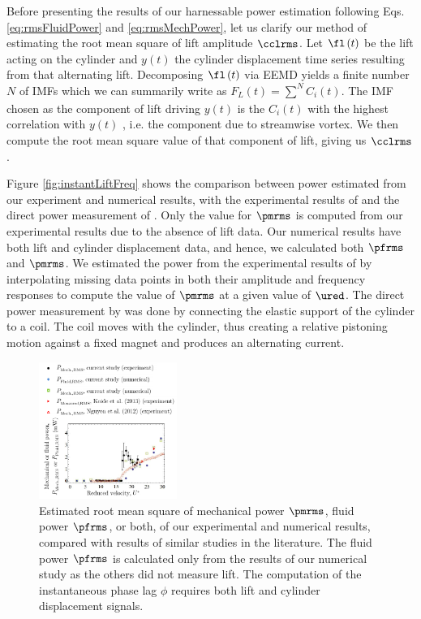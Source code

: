 \documentclass[a4paper,fleqn]{cas-sc}
\begin{document}
Before presenting the results of our harnessable power estimation following Eqs. \ref{eq:rmsFluidPower} and \ref{eq:rmsMechPower}, let us clarify our method of estimating the root mean square of lift amplitude $\cclrms$. Let $\fl\left( t \right)$ be the lift acting on the cylinder and $y\left( t \right)$ the cylinder displacement time series resulting from that alternating lift. Decomposing $\fl\left( t \right)$ via EEMD yields a finite number $N$ of IMFs which we can summarily write as $F_{L} \left( t \right) = \sum\limits_{}^{N}C_{i} \left( t \right) $. The IMF chosen as the component of lift driving $y \left( t \right) $  is the $C_{i} \left( t \right) $  with the highest correlation with  $ y \left( t \right)  $ , i.e. the component due to streamwise vortex. We then compute the root mean square value of that component of lift, giving us $\cclrms$.

Figure \ref{fig:instantLiftFreq} shows the comparison between power estimated from our experiment and numerical results, with the experimental results of \citet{Nguyen2012} and the direct power measurement of \citet{Koide2013}. Only the value for $\pmrms$ is computed from our experimental results due to the absence of lift data. Our numerical results have both lift and cylinder displacement data, and hence, we calculated both $\pfrms$ and $\pmrms$. We estimated the power from the experimental results of \citet{Nguyen2012} by interpolating missing data points in both their amplitude and frequency responses to compute the value of $\pmrms$ at a given value of $\ured$. The direct power measurement by \citet{Koide2013} was done by connecting the elastic support of the cylinder to a coil. The coil moves with the cylinder, thus creating a relative pistoning motion against a fixed magnet and produces an alternating current.

\begin{figure}
  \centering
  \includegraphics[width=0.4\textwidth]{figs/figure20}
  \caption{Estimated root mean square of mechanical power $\pmrms$, fluid power $\pfrms$, or both, of our experimental and numerical results, compared with results of similar studies in the literature. The fluid power $\pfrms$ is calculated only from the results of our numerical study as the others did not measure lift. The computation of the instantaneous phase lag $\phi$ requires both lift and cylinder displacement signals.}
  \label{fig:powerComparison}
\end{figure}
\end{document}
